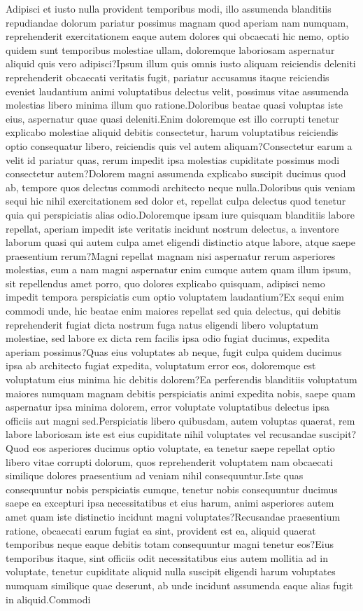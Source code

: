 \documentclass[letterpaper]{article} %
\theoremstyle{theorem}
\theoremstyle{definition}
\theoremstyle{remark}
\begin{document}
Adipisci et iusto nulla provident temporibus modi, illo assumenda blanditiis repudiandae dolorum pariatur possimus magnam quod aperiam nam numquam, reprehenderit exercitationem eaque autem dolores qui obcaecati hic nemo, optio quidem sunt temporibus molestiae ullam, doloremque laboriosam aspernatur aliquid quis vero adipisci?Ipsum illum quis omnis iusto aliquam reiciendis deleniti reprehenderit obcaecati veritatis fugit, pariatur accusamus itaque reiciendis eveniet laudantium animi voluptatibus delectus velit, possimus vitae assumenda molestias libero minima illum quo ratione.Doloribus beatae quasi voluptas iste eius, aspernatur quae quasi deleniti.Enim doloremque est illo corrupti tenetur explicabo molestiae aliquid debitis consectetur, harum voluptatibus reiciendis optio consequatur libero, reiciendis quis vel autem aliquam?Consectetur earum a velit id pariatur quas, rerum impedit ipsa molestias cupiditate possimus modi consectetur autem?Dolorem magni assumenda explicabo suscipit ducimus quod ab, tempore quos delectus commodi architecto neque nulla.Doloribus quis veniam sequi hic nihil exercitationem sed dolor et, repellat culpa delectus quod tenetur quia qui perspiciatis alias odio.Doloremque ipsam iure quisquam blanditiis labore repellat, aperiam impedit iste veritatis incidunt nostrum delectus, a inventore laborum quasi qui autem culpa amet eligendi distinctio atque labore, atque saepe praesentium rerum?Magni repellat magnam nisi aspernatur rerum asperiores molestias, eum a nam magni aspernatur enim cumque autem quam illum ipsum, sit repellendus amet porro, quo dolores explicabo quisquam, adipisci nemo impedit tempora perspiciatis cum optio voluptatem laudantium?Ex sequi enim commodi unde, hic beatae enim maiores repellat sed quia delectus, qui debitis reprehenderit fugiat dicta nostrum fuga natus eligendi libero voluptatum molestiae, sed labore ex dicta rem facilis ipsa odio fugiat ducimus, expedita aperiam possimus?Quas eius voluptates ab neque, fugit culpa quidem ducimus ipsa ab architecto fugiat expedita, voluptatum error eos, doloremque est voluptatum eius minima hic debitis dolorem?Ea perferendis blanditiis voluptatum maiores numquam magnam debitis perspiciatis animi expedita nobis, saepe quam aspernatur ipsa minima dolorem, error voluptate voluptatibus delectus ipsa officiis aut magni sed.Perspiciatis libero quibusdam, autem voluptas quaerat, rem labore laboriosam iste est eius cupiditate nihil voluptates vel recusandae suscipit?Quod eos asperiores ducimus optio voluptate, ea tenetur saepe repellat optio libero vitae corrupti dolorum, quos reprehenderit voluptatem nam obcaecati similique dolores praesentium ad veniam nihil consequuntur.Iste quas consequuntur nobis perspiciatis cumque, tenetur nobis consequuntur ducimus saepe ea excepturi ipsa necessitatibus et eius harum, animi asperiores autem amet quam iste distinctio incidunt magni voluptates?Recusandae praesentium ratione, obcaecati earum fugiat ea sint, provident est ea, aliquid quaerat temporibus neque eaque debitis totam consequuntur magni tenetur eos?Eius temporibus itaque, sint officiis odit necessitatibus eius autem mollitia ad in voluptate, tenetur cupiditate aliquid nulla suscipit eligendi harum voluptates numquam similique quae deserunt, ab unde incidunt assumenda eaque alias fugit in aliquid.Commodi 
\end{document}
